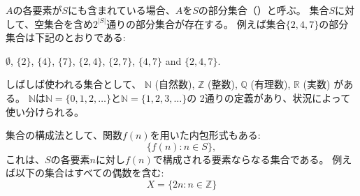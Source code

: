 \begin{comment}
If each element of $A$ also belongs to $S$,
we say that $A$ is a \key{subset} of $S$,
denoted by $A \subset S$.
A set $S$ always has $2^{|S|}$ subsets,
including the empty set.
For example, the subsets of the set $\{2,4,7\}$ are
\begin{center}
$\emptyset$,
$\{2\}$, $\{4\}$, $\{7\}$, $\{2,4\}$, $\{2,7\}$, $\{4,7\}$ and $\{2,4,7\}$.
\end{center}
\end{comment}

$A$の各要素が$S$にも含まれている場合、$A$を$S$の部分集合（）と呼ぶ。
集合$S$に対して、空集合を含め$2^{|S|}$通りの部分集合が存在する。 
例えば集合$\{2,4,7\}$の部分集合は下記のとおりである:
\begin{center}
$\emptyset$,
$\{2\}$, $\{4\}$, $\{7\}$, $\{2,4\}$, $\{2,7\}$, $\{4,7\}$ and $\{2,4,7\}$.
\end{center}

\begin{comment}
Some often used sets are
$\mathbb{N}$ (natural numbers),
$\mathbb{Z}$ (integers),
$\mathbb{Q}$ (rational numbers) and
$\mathbb{R}$ (real numbers).
The set $\mathbb{N}$
can be defined in two ways, depending
on the situation:
either $\mathbb{N}=\{0,1,2,\ldots\}$
or $\mathbb{N}=\{1,2,3,...\}$.
\end{comment}

しばしば使われる集合として、
$\mathbb{N}$ (自然数),
$\mathbb{Z}$ (整数),
$\mathbb{Q}$ (有理数),
$\mathbb{R}$ (実数)
がある。
$\mathbb{N}$は$\mathbb{N}=\{0,1,2,\ldots\}$と$\mathbb{N}=\{1,2,3,\ldots\}$の
2通りの定義があり、状況によって使い分けられる。



\begin{comment}
We can also construct a set using a rule of the form
\[\{f(n) : n \in S\},\]
where $f(n)$ is some function.
This set contains all elements of the form $f(n)$,
where $n$ is an element in $S$.
For example, the set
\[X=\{2n : n \in \mathbb{Z}\}\]
contains all even integers.
\end{comment}

集合の構成法として、関数$f(n)$を用いた内包形式もある:
\[\{f(n) : n \in S\},\]
これは、$S$の各要素$n$に対し$f(n)$で構成される要素ならなる集合である。
例えば以下の集合はすべての偶数を含む:
\[X=\{2n : n \in \mathbb{Z}\}\]


\begin{comment}
\subsubsection{Logic}
\end{comment}
